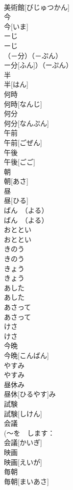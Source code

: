 \documentclass[8pt]{extreport}
\begin{document}
\begin{CJK}{UTF8}{min}
\\	美術館[びじゅつかん]	
\\	今	
\\	今[いま]	
\\	ーじ	
\\	ーじ	
\\	（－分）（－ぷん）	
\\	ー分[ふん]）（ーぷん）	
\\	半	
\\	半[はん]	
\\	何時	
\\	何時[なんじ]	
\\	何分	
\\	何分[なんぷん]	
\\	午前	
\\	午前[ごぜん]	
\\	午後	
\\	午後[ごご]	
\\	朝	
\\	朝[あさ]	
\\	昼	
\\	昼[ひる]	
\\	ばん　（よる）	
\\	ばん　（よる）	
\\	おととい	
\\	おととい	
\\	きのう	
\\	きのう	
\\	きょう	
\\	きょう	
\\	あした	
\\	あした	
\\	あさって	
\\	あさって	
\\	けさ	
\\	けさ	
\\	今晩	
\\	今晩[こんばん]	
\\	やすみ	
\\	やすみ	
\\	昼休み	
\\	昼休[ひるやす]み	
\\	試験	
\\	試験[しけん]	
\\	会議	
\\	(～を　します：
\\	会議[かいぎ]	
\\	映画	
\\	映画[えいが]	
\\	毎朝	
\\	毎朝[まいあさ]	

\end{CJK}
\end{document}

